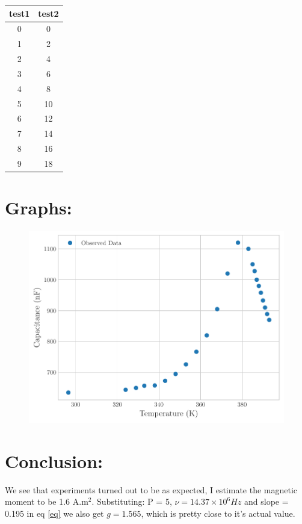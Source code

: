 \documentclass{article}
\begin{document}
\begin{table}[H]
    \centering
    \begin{tabular}{@{}cc@{}}
        \toprule
        ﻿test1 & test2 \\
        \midrule
        0 & 0 \\
        1 & 2 \\
        2 & 4 \\
        3 & 6 \\
        4 & 8 \\
        5 & 10 \\
        6 & 12 \\
        7 & 14 \\
        8 & 16 \\
        9 & 18 \\
        \bottomrule
    \end{tabular}
\end{table}
\section{Graphs:}
\begin{figure}[H]
\centering
\includegraphics[width = \columnwidth]{../_assets/Capacitance.pdf}
\end{figure}
\section{Conclusion:}
We see that experiments turned out to be as expected, I estimate the magnetic moment to be 1.6 A.m\(^2\). Substituting: P = 5, \(\nu = 14.37 \times 10^6 Hz\) and slope = 0.195 in eq \ref{eq} we also get \(g = 1.565\), which is pretty close to it's actual value.
\end{document}
